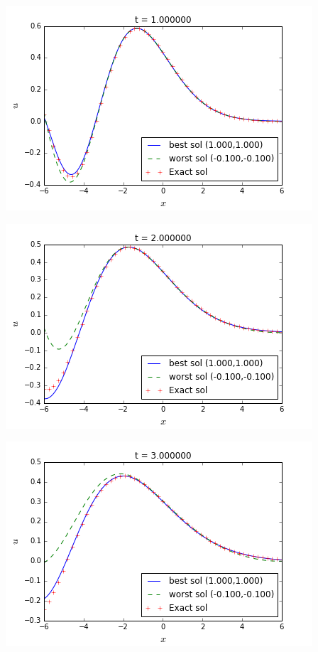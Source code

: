 \begingroup
\begin{minipage}{.5\linewidth}
\includegraphics[scale=.5]{figures/BessefirstTestsP0Snap2.png}
\end{minipage}
\begin{minipage}{.5\linewidth}
	\includegraphics[scale=.5]{figures/BessefirstTestsP0Snap3.png}
\end{minipage}
\begin{minipage}{.5\linewidth}
\includegraphics[scale=.5]{figures/BessefirstTestsP0Snap4.png}
\end{minipage}
